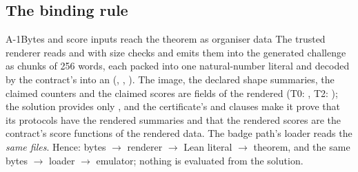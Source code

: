\subsection{The binding rule}\label{subsec:arch-binding}

\begin{decision}{A-1}{Bytes and score inputs reach the theorem as organiser data}
The trusted renderer reads  and  with size checks and
emits them into the generated challenge as chunks of 256 words, each packed into one natural-number
literal and decoded by the contract's  into an 
(, , ). The image, the declared shape summaries,
the claimed counters and the claimed scores are fields of the rendered  (T0:
, T2: ); the solution provides only , and the
certificate's  and  clauses make it prove that its protocols have the
rendered summaries and that the rendered scores are the contract's score functions of the rendered
data. The badge path's loader reads the \emph{same files}. Hence: bytes $\to$ renderer $\to$ Lean
literal $\to$ theorem, and the same bytes $\to$ loader $\to$ emulator; nothing is evaluated from the
solution.
\end{decision}

